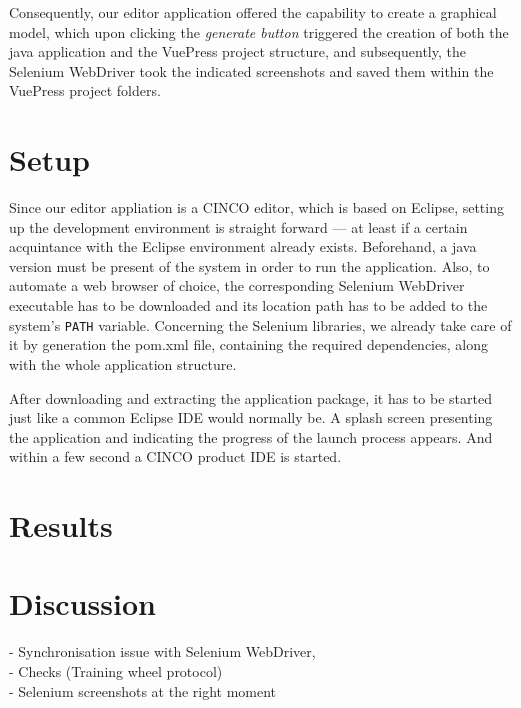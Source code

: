Consequently, our editor application offered the capability to create a graphical model, which upon clicking the \textit{generate button} triggered the creation of both the java application and the VuePress project structure, and subsequently, the Selenium WebDriver took the indicated screenshots and saved them within the VuePress project folders.

\section{Setup}\label{sec:setup}

Since our editor appliation is a CINCO editor, which is based on Eclipse, setting up the development environment is straight forward --- at least if a certain acquintance with the Eclipse environment already exists. Beforehand, a java version must be present of the system in order to run the application. Also, to automate a web browser of choice, the corresponding Selenium WebDriver executable has to be downloaded and its location path has to be added to the system's \lstinline{PATH} variable. Concerning the Selenium libraries, we already take care of it by generation the pom.xml file, containing the required dependencies, along with the whole application structure.

After downloading and extracting the application package, it has to be started just like a common Eclipse IDE would normally be. A splash screen presenting the application and indicating the progress of the launch process appears. And within a few second a CINCO product IDE is started. 

\section{Results}\label{sec:res}

\section{Discussion}\label{sec:disc}

- Synchronisation issue with Selenium WebDriver,\\
- Checks (Training wheel protocol)\\
- Selenium screenshots at the right moment
